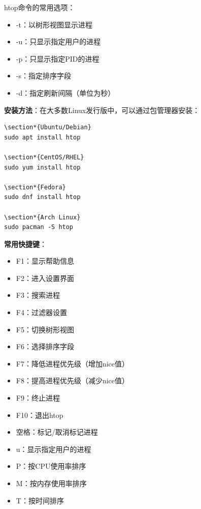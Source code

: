 \documentclass[12pt,UTF8]{ctexbook}
\begin{document}
htop命令的常用选项：
\begin{itemize}
    \item -t：以树形视图显示进程
    \item -u：只显示指定用户的进程
    \item -p：只显示指定PID的进程
    \item -s：指定排序字段
    \item -d：指定刷新间隔（单位为秒）
\end{itemize}

\textbf{安装方法}：在大多数Linux发行版中，可以通过包管理器安装：
\begin{verbatim}
\section*{Ubuntu/Debian}
sudo apt install htop

\section*{CentOS/RHEL}
sudo yum install htop

\section*{Fedora}
sudo dnf install htop

\section*{Arch Linux}
sudo pacman -S htop
\end{verbatim}

\textbf{常用快捷键}：
\begin{itemize}
    \item F1：显示帮助信息
    \item F2：进入设置界面
    \item F3：搜索进程
    \item F4：过滤器设置
    \item F5：切换树形视图
    \item F6：选择排序字段
    \item F7：降低进程优先级（增加nice值）
    \item F8：提高进程优先级（减少nice值）
    \item F9：终止进程
    \item F10：退出htop
    \item 空格：标记/取消标记进程
    \item u：显示指定用户的进程
    \item P：按CPU使用率排序
    \item M：按内存使用率排序
    \item T：按时间排序
\end{itemize}
\end{document}
